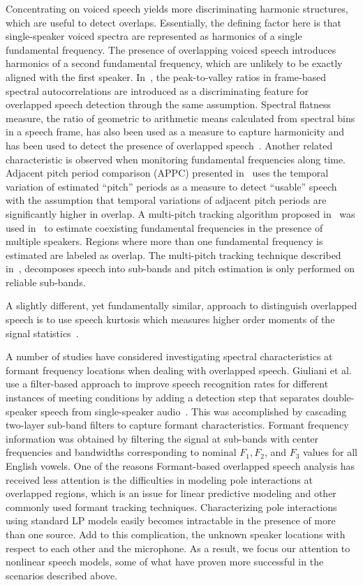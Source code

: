 Concentrating on voiced speech yields more discriminating harmonic structures, which are useful to detect overlaps. 
Essentially, the defining factor here is that single-speaker voiced spectra are represented as harmonics of a single fundamental frequency. 
The presence of overlapping voiced speech introduces harmonics of a second fundamental frequency, which are unlikely to be exactly aligned with the first speaker. 
In~\cite{sapvr_2000}, the peak-to-valley ratios in frame-based spectral autocorrelations are introduced as a discriminating feature for overlapped speech detection through the same assumption. 
Spectral flatness measure, the ratio of geometric to arithmetic means calculated from spectral bins in a speech frame, has also been used as a measure to capture harmonicity and has been used to detect the presence of overlapped speech~\cite{nav_icassp13}. 
Another related characteristic is observed when monitoring fundamental frequencies along time. 
Adjacent pitch period comparison (APPC) presented in~\cite{appc2001} uses the temporal variation of estimated ``pitch'' periods as a measure to detect ``usable'' speech with the assumption that temporal variations of adjacent pitch periods are significantly higher in overlap. 
A multi-pitch tracking algorithm proposed in~\cite{Dwang_03_trans} was used in~\cite{Dwang_03} to estimate coexisting fundamental frequencies in the presence of multiple speakers. 
Regions where more than one fundamental frequency is estimated are labeled as overlap. 
The multi-pitch tracking technique described in~\cite{Dwang_03_trans}, decomposes speech into sub-bands and pitch estimation is only performed on reliable sub-bands. 

A slightly different, yet fundamentally similar, approach to distinguish overlapped speech is to use speech kurtosis which measures higher order moments of the signal statistics~\cite{Wrigley_05}. 


A number of studies have considered investigating spectral characteristics at formant frequency locations when dealing with overlapped speech. 
Giuliani et al. use a filter-based approach to improve speech recognition rates for different instances of meeting conditions by adding a detection step that separates double-speaker speech from single-speaker audio~\cite{giuliani_meeting}. 
This was accomplished by cascading two-layer sub-band filters to capture formant characteristics. 
Formant frequency information was obtained by filtering the signal at sub-bands with center frequencies and bandwidths corresponding to nominal ${F_1, F_2}$, and ${F_3}$ values for all English vowels. 
One of the reasons Formant-based overlapped speech analysis has received less attention is the difficulties in modeling pole interactions at overlapped regions, which is an issue for linear predictive modeling and other commonly used formant tracking techniques. 
Characterizing pole interactions using standard LP models easily becomes intractable in the presence of more than one source. 
Add to this complication, the unknown speaker locations with respect to each other and the microphone. 
As a result, we focus our attention to nonlinear speech models, some of what have proven more successful in the scenarios described above. 

